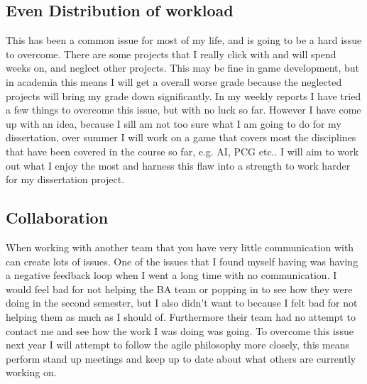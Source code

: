 \documentclass{scrartcl}
\begin{document}
\subsection{Even Distribution of workload}
This has been a common issue for most of my life, and is going to be a hard issue to overcome. There are some projects that I really click with and will spend weeks on, and neglect other projects. This may be fine in game development, but in academia this means I will get a overall worse grade because the neglected projects will bring my grade down significantly.
In my weekly reports I have tried a few things to overcome this issue, but with no luck so far. However I have come up with an idea, because I sill am not too sure what I am going to do for my dissertation, over summer I will work on a game that covers most the disciplines that have been covered in the course so far, e.g. AI, PCG etc.. I will aim to work out what I enjoy the most and harness this flaw into a strength to work harder for my dissertation project.

\subsection{Collaboration}
When working with another team that you have very little communication with can create lots of issues. One of the issues that I found myself having was having a negative feedback loop when I went a long time with no communication. I would feel bad for not helping the BA team or popping in to see how they were doing in the second semester, but I also didn't want to because I felt bad for not helping them as much as I should of. Furthermore their team had no attempt to contact me and see how the work I was doing was going.
To overcome this issue next year I will attempt to follow the agile philosophy more closely, this means perform stand up meetings and keep up to date about what others are currently working on. 

\end{document}
